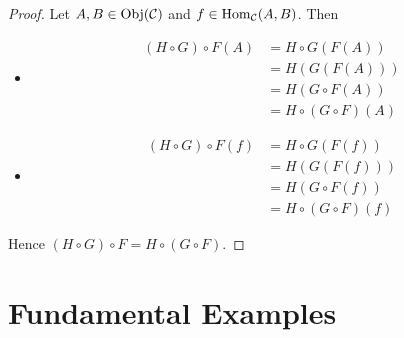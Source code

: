\documentclass{book}
\begin{document}
	\begin{proof}
		Let $A, B \in \operatorname{Obj}(\mathcal{C})$ and $f \in \operatorname{Hom}_{\mathcal{C}}(A,B)$. Then 
		\begin{itemize}
			\item 
			\begin{align*}
				(H \circ G) \circ F(A) 
				& = H \circ G (F(A)) \\
				& = H (G(F(A))) \\
				& = H( G \circ F (A)) \\
				& = H \circ (G \circ F) (A)
			\end{align*}
			\item  
			\begin{align*}
				(H \circ G) \circ F(f) 
				& = H \circ G (F(f)) \\
				& = H (G(F(f))) \\
				& = H( G \circ F (f)) \\
				& = H \circ (G \circ F) (f)
			\end{align*}
		\end{itemize}
		Hence $(H \circ G) \circ F = H \circ (G \circ F)$.
	\end{proof}
	
	
	
	
	
	
	
	















































\section{Fundamental Examples}
\end{document}
